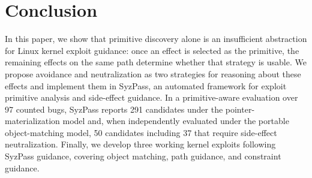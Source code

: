 \section{Conclusion}
In this paper, we show that primitive discovery alone is an insufficient abstraction for Linux kernel exploit guidance: once an effect is selected as the primitive, the remaining effects on the same path determine whether that strategy is usable. We propose avoidance and neutralization as two strategies for reasoning about these effects and implement them in SyzPass, an automated framework for exploit primitive analysis and side-effect guidance. In a primitive-aware evaluation over 97 counted bugs, SyzPass reports 291 candidates under the pointer-materialization model and, when independently evaluated under the portable object-matching model, 50 candidates including 37 that require side-effect neutralization. Finally, we develop three working kernel exploits following SyzPass guidance, covering object matching, path guidance, and constraint guidance.
